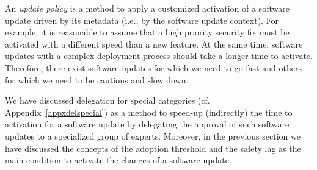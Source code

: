 An \emph{update policy} is a method to apply a customized activation of a software update driven by its metadata (i.e., by the software update context). For example, it is reasonable to assume that a high priority security fix must be activated with a different speed than a  new feature. At the same time, 
 software updates with a complex deployment process should take a longer time to activate. Therefore, there exist software updates for which we need to go fast and others for which we need to be cautious and slow down.

We have discussed delegation for special categories (cf. Appendix~\ref{appxdelspecial}) as a method to speed-up (indirectly) the time to activation for a software update by delegating the approval of such software updates to a specialized group of experts. Moreover, in the previous section we have discussed the concepts of the adoption threshold and the safety lag as the main condition to activate the changes of a software update.




